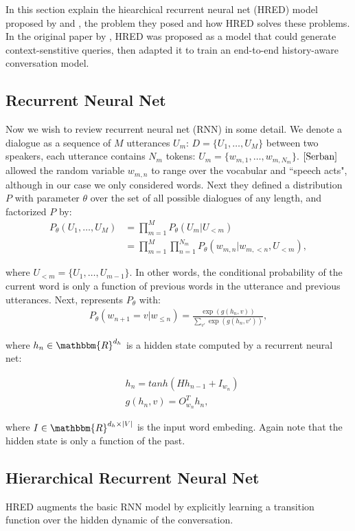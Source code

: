In this section explain the hiearchical recurrent neural net (HRED) model proposed by \cite{Serban} and \cite{Sordoni}, the problem they posed and how HRED solves these problems. In the original paper by \cite{Sordini}, HRED was proposed as a model that could generate context-senstitive queries, then \cite{Serban} adapted it to train an end-to-end history-aware conversation model.

\subsection{Recurrent Neural Net}

Now we wish to review recurrent neural net (RNN) in some detail. We denote a dialogue as a sequence of $M$ utterances $U_m$: $D = \{U_1, \ldots, U_M\}$ between two speakers, each utterance contains $N_m$ tokens: $U_m = \{w_{m,1},\ldots,w_{m,N_m}\}$. $\cite{Serban}$ allowed the random variable $w_{m,n}$ to range over the vocabular and ``speech acts", although in our case we only considered words. Next they defined a distribution $P$ with parameter $\theta$ over the set of all possible dialogues of any length, and factorized $P$ by:
    \begin{align*}
        P_{\theta}(U_1, \ldots, U_M) &= \prod_{m=1}^M P_{\theta}(U_m | U_{<m}) \\
                                     &= \prod_{m=1}^M \prod_{n=1}^{N_m} P_{\theta} (w_{m,n}|w_{m,<n}, U_{<m}),
    \end{align*}

where $U_{<m} = \{U_1, \ldots, U_{m-1}\}$. In other words, the conditional probability of the current word is only a function of previous words in the utterance and previous utterances. Next, \cite{Serban} represents $P_{\theta}$ with:
    \begin{align*}
        P_{\theta} (w_{n+1} = v | w_{\leq n}) = \frac{\exp(g(h_n,v))}{\sum_{v'} \exp(g(h_n, v'))},
    \end{align*}

where $h_n \in \mathbbm{R}^{d_h}$ is a hidden state computed by a recurrent neural net:

    \begin{align*}
        &h_n = tanh (H h_{n-1} + I_{w_n}) \\
        &g(h_n, v) = O^{T}_{w_n} h_n,
    \end{align*}

where $I \in \mathbbm{R}^{d_h \times |V|}$ is the input word embeding. Again note that the hidden state is only a function of the past. 

\subsection{Hierarchical Recurrent Neural Net}

HRED augments the basic RNN model by explicitly learning a transition function over the hidden dynamic of the conversation. 









